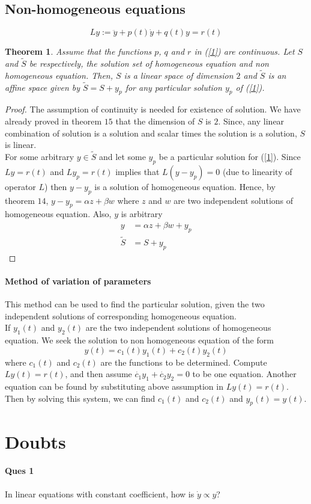 \documentclass[12pt,reqno]{amsart}
\theoremstyle{plain}
\newtheorem{thm}{Theorem}
\theoremstyle{definition}
\begin{document}
\subsection{Non-homogeneous equations}
\begin{equation}\label{1}
    Ly := \ddot{y} + p(t)\dot{y} + q(t)y = r(t)
\end{equation}
\begin{thm}
    Assume that the functions $p$, $q$ and $r$ in (\ref{1}) are continuous. Let $S$ and $\tilde{S}$ be respectively, the solution set of homogeneous equation and non homogeneous equation. Then, $S$ is a linear space of dimension $2$ and $\tilde{S}$ is an affine space given by $\tilde{S} = S + y_p$ for any particular solution $y_p$ of (\ref{1}).
\end{thm}
\begin{proof}
    The assumption of continuity is needed for existence of solution. We have already proved in theorem $15$ that the dimension of $S$ is $2$. Since, any linear combination of solution is a solution and scalar times the solution is a solution, $S$ is linear.\\
    For some arbitrary $y \in \tilde{S}$ and let some $y_p$ be a particular solution for (\ref{1}). Since $Ly = r(t)$ and $Ly_p = r(t)$ implies that $L(y-y_p) = 0$ (due to linearity of operator $L$) then $y - y_p$ is a solution of homogeneous equation. Hence, by theorem $14$, $y - y_p = \alpha z + \beta w$ where $z$ and $w$ are two independent solutions of homogeneous equation. Also, $y$ is arbitrary
    \begin{align*}
        y &= \alpha z + \beta w + y_p\\
        \tilde{S} &= S + y_p        
    \end{align*}
\end{proof}
\paragraph{\bf Method of variation of parameters} This method can be used to find the particular solution, given the two independent solutions of corresponding homogeneous equation.\\
If $y_1(t)$ and $y_2(t)$ are the two independent solutions of homogeneous equation. We seek the solution to non homogeneous equation of the form 
$$ y(t) = c_1(t)y_1(t) + c_2(t)y_2(t) $$
where $c_1(t)$ and $c_2(t)$ are the functions to be determined. Compute $Ly(t) = r(t)$, and then assume $\dot{c_1}y_1 + \dot{c_2}y_2 = 0$ to be one equation. Another equation can be found by substituting above assumption in $Ly(t) = r(t)$. Then by solving this system, we can find $c_1(t)$ and $c_2(t)$ and $y_p(t) = y(t)$.




\section{Doubts}
\paragraph{\bf Ques 1} In linear equations with constant coefficient, how is $\dot{y} \propto y$?
\end{document}
